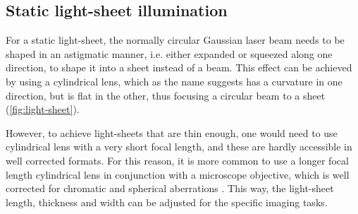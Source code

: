 
  \subsection{Static light-sheet illumination}
    For a static light-sheet, the normally circular Gaussian laser beam needs to be shaped in an astigmatic manner, i.e. either expanded or squeezed along one direction, to shape it into a sheet instead of a beam. This effect can be achieved by using a cylindrical lens, which as the name suggests has a curvature in one direction, but is flat in the other, thus focusing a circular beam to a sheet (\autoref{fig:light-sheet}).
    
    However, to achieve light-sheets that are thin enough, one would need to use cylindrical lens with a very short focal length, and these are hardly accessible in well corrected formats. For this reason, it is more common to use a longer focal length cylindrical lens in conjunction with a microscope objective, which is well corrected for chromatic and spherical aberrations \cite{greger_basic_2007}. This way, the light-sheet length, thickness and width can be adjusted for the specific imaging tasks.


